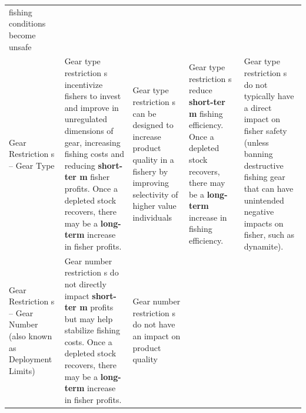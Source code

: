 \documentclass[]{book}
\begin{document}
\begin{longtable}[]{@{}lllll@{}}
\begin{minipage}[t]{0.17\columnwidth}
fishing conditions become unsafe\strut
\end{minipage}\tabularnewline
\begin{minipage}[t]{0.17\columnwidth}\raggedright\strut
Gear Restriction s -- Gear Type\strut
\end{minipage} & \begin{minipage}[t]{0.17\columnwidth}\raggedright\strut
Gear type restriction s incentivize fishers to invest and improve in
unregulated dimensions of gear, increasing fishing costs and reducing
\textbf{short-ter m} fisher profits. Once a depleted stock recovers,
there may be a \textbf{long-term } increase in fisher profits.\strut
\end{minipage} & \begin{minipage}[t]{0.17\columnwidth}\raggedright\strut
Gear type restriction s can be designed to increase product quality in a
fishery by improving selectivity of higher value individuals\strut
\end{minipage} & \begin{minipage}[t]{0.17\columnwidth}\raggedright\strut
Gear type restriction s reduce \textbf{short-ter m} fishing efficiency.
Once a depleted stock recovers, there may be a \textbf{long-term }
increase in fishing efficiency.\strut
\end{minipage} & \begin{minipage}[t]{0.17\columnwidth}\raggedright\strut
Gear type restriction s do not typically have a direct impact on fisher
safety (unless banning destructive fishing gear that can have unintended
negative impacts on fisher, such as dynamite).\strut
\end{minipage}\tabularnewline
\begin{minipage}[t]{0.17\columnwidth}\raggedright\strut
Gear Restriction s -- Gear Number (also known as Deployment
Limits)\strut
\end{minipage} & \begin{minipage}[t]{0.17\columnwidth}\raggedright\strut
Gear number restriction s do not directly impact \textbf{short-ter m}
profits but may help stabilize fishing costs. Once a depleted stock
recovers, there may be a \textbf{long-term } increase in fisher
profits.\strut
\end{minipage} & \begin{minipage}[t]{0.17\columnwidth}\raggedright\strut
Gear number restriction s do not have an impact on product quality\strut
\end{minipage} & \begin{minipage}[t]{0.17\columnwidth}\raggedright\strut

\end{minipage}
\end{longtable}
\end{document}
